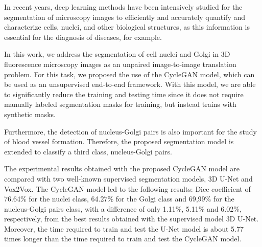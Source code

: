 \acresetall
\noindent In recent years, deep learning methods have been intensively studied for the segmentation of microscopy images to efficiently and accurately quantify and characterize cells, nuclei, and other biological structures, as this information is essential for the diagnosis of diseases, for example.

In this work, we address the segmentation of cell nuclei and Golgi in \ac{3D} fluorescence microscopy images as an unpaired image-to-image translation problem. For this task, we proposed the use of the CycleGAN model, which can be used as an unsupervised end-to-end framework. With this model, we are able to significantly reduce the training and testing time since it does not require manually labeled segmentation masks for training, but instead trains with synthetic masks.

Furthermore, the detection of nucleus-Golgi pairs is also important for the study of blood vessel formation. Therefore, the proposed segmentation model is extended to classify a third class, nucleus-Golgi pairs.

The experimental results obtained with the proposed CycleGAN model are compared with two well-known supervised segmentation models, \ac{3D} U-Net and Vox2Vox. The CycleGAN model led to the following results: Dice coefficient of 76.64\% for the nuclei class, 64.27\% for the Golgi class and 69,99\% for the nucleus-Golgi pairs class, with a difference of only 1.11\%, 5.11\% and 6.02\%, respectively, from the best results obtained with the supervised model \ac{3D} U-Net. Moreover, the time required to train and test the U-Net model is about 5.77 times longer than the time required to train and test the CycleGAN model.